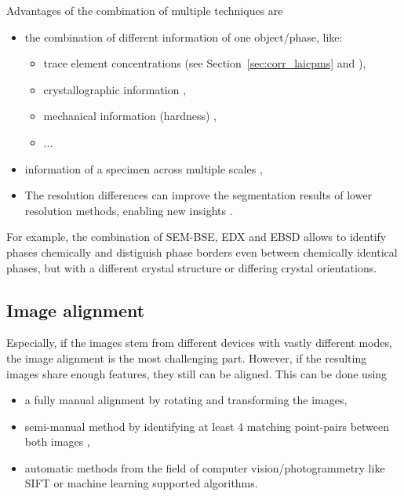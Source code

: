 Advantages of the combination of multiple techniques are
\begin{itemize}
    \item the combination of different information of one object/phase, like:
    \begin{itemize}
        \item trace element concentrations (see Section~\ref{sec:corr_laicpms} and \cite{kleiner.2022b}),
        \item crystallographic information \cite{rossler.2022},
        \item mechanical information (hardness) \cite{chen.2010,li.2025}, %
        \item ...
    \end{itemize}
    \item information of a specimen across multiple scales \cite{daly.2017,mitchell.2019,mitchell.2021,kleiner.2022a},
    \item The resolution differences can improve the segmentation results of lower resolution methods, enabling new insights \cite{kleiner.2022b}.
\end{itemize}

For example, the combination of \ac{SEM}-\ac{BSE}, \ac{EDX} and \ac{EBSD} allows to identify phases chemically and distiguish phase borders even between chemically identical phases, but with a different crystal structure or differing crystal orientations.

\subsection{Image alignment}

Especially, if the images stem from different devices with vastly different modes, the image alignment is the most challenging part.
However, if the resulting images share enough features, they still can be aligned.
This can be done using
\begin{itemize}
    \item a fully manual alignment by rotating and transforming the images,
    \item {\color{red} semi-manual method by identifying at least 4 matching point-pairs between both images \cite{},}
    \item automatic methods from the field of computer vision/photogrammetry like \ac{SIFT} \cite{lowe.2004} or machine learning supported algorithms.
\end{itemize}

